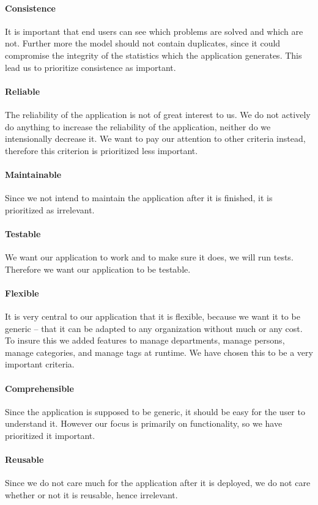 \paragraph{Consistence}
It is important that end users can see which problems are solved and which are not.
Further more the \hdesk[] model should not contain duplicates, since it could compromise the integrity of the statistics which the application generates.
This lead us to prioritize consistence as important.
\paragraph{Reliable}
The reliability of the \hdesk[] application is not of great interest to us.
We do not actively do anything to increase the reliability of the application, neither do we intensionally decrease it.
We want to pay our attention to other criteria instead, therefore this criterion is prioritized less important.
\paragraph{Maintainable}
Since we not intend to maintain the application after it is finished, it is prioritized as irrelevant.
\paragraph{Testable}
We want our application to work and to make sure it does, we will run tests.
Therefore we want our application to be testable.
\paragraph{Flexible}
It is very central to our application that it is flexible, because we want it to be generic -- that it can be adapted to any organization without much or any cost. To insure this we added features to manage departments, manage persons, manage categories, and manage tags at runtime. We have chosen this to be a very important criteria.
\paragraph{Comprehensible}
Since the \hdesk[] application is supposed to be generic, it should be easy for the user to understand it.
However our focus is primarily on functionality, so we have prioritized it important.
\paragraph{Reusable}
Since we do not care much for the application after it is deployed, we do not care whether or not it is reusable, hence irrelevant.
